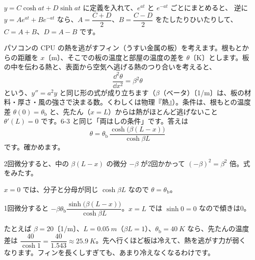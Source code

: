 $y=C\cosh at+D\sinh at$ に定義を入れて、$e^{at}$ と $e^{-at}$ ごとにまとめると、
逆に $y=Ae^{at}+Be^{-at}$ なら、$A=\dfrac{C+D}{2}$、$B=\dfrac{C-D}{2}$ をたしたりひいたりして、$C=A+B$、$D=A-B$ です。

\begin{motto}[5]
パソコンの CPU の熱を逃がすフィン（うすい金属の板）を考えます。根もとからの距離を $x$〔m〕、そこでの板の温度と部屋の温度の差を $\theta$〔K〕とします。板の中を伝わる熱と、表面から空気へ逃げる熱のつり合いを考えると、
\[ \frac{\dd^2\theta}{\dd x^2}=\beta^2\theta \]
という、$y''=a^2y$ と同じ形の式が成り立ちます（$\beta$（ベータ）〔1/m〕は、板の材料・厚さ・風の強さで決まる数。くわしくは物理『熱』）。条件は、根もとの温度差 $\theta(0)=\theta_{\mathrm b}$ と、先たん（$x=L$）からは熱がほとんど逃げないこと $\theta'(L)=0$ です。6-3 と同じ「両はしの条件」です。答えは
\[ \theta=\theta_{\mathrm b}\,\frac{\cosh\bigl(\beta(L-x)\bigr)}{\cosh\beta L} \]
です。確かめます。
\begin{enumerate}[label={\bkcircled[\bkTF]{\arabic*}}, leftmargin=2.4\zw, itemsep=1pt, topsep=2pt]
\item 2回微分すると、中の $\beta(L-x)$ の微分 $-\beta$ が2回かかって $(-\beta)^2=\beta^2$ 倍。式をみたす。
\item $x=0$ では、分子と分母が同じ $\cosh\beta L$ なので $\theta=\theta_{\mathrm b}$。
\item 1回微分すると $-\beta\theta_{\mathrm b}\dfrac{\sinh\bigl(\beta(L-x)\bigr)}{\cosh\beta L}$。$x=L$ では $\sinh0=0$ なので傾きは0。
\end{enumerate}
\noindent\begin{minipage}[c]{0.56\linewidth}
たとえば $\beta=20$〔1/m〕、$L=\qty{0.05}{m}$（$\beta L=1$）、$\theta_{\mathrm b}=\qty{40}{K}$ なら、先たんの温度差は $\dfrac{40}{\cosh1}=\dfrac{40}{1.543}\approx\qty{25.9}{K}$。先へ行くほど板は冷えて、熱を逃がす力が弱くなります。フィンを長くしすぎても、あまり冷えなくなるわけです。
\end{minipage}\hfill
\begin{minipage}[c]{0.42\linewidth}
\centering
{}
\end{minipage}
\end{motto}

